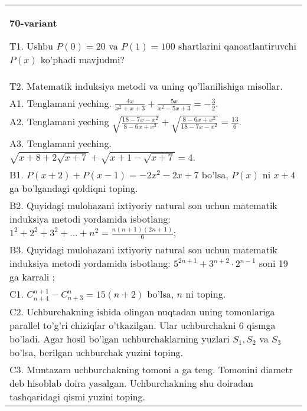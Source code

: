 \documentclass{article}
\begin{document}
\begin{tabular}{m{17cm}}
\textbf{70-variant}
\newline

T1. Ushbu \(P(0) = 20\) va \(P(1) = 100\) shartlarini qanoatlantiruvchi \(P(x)\) ko'phadi mavjudmi? \\
T2. Matematik induksiya metodi va uning qo'llanilishiga misollar. \\
A1. Tenglamani yeching. \(\frac{4x}{x^{2} + x + 3} + \frac{5x}{x^{2} - 5x + 3} = - \frac{3}{2}\). \\
A2. Tenglamani yeching \(\sqrt{\frac{18 - 7x - x^{2}}{8 - 6x + x^{2}}} + \sqrt{\frac{8 - 6x + x^{2}}{18 - 7x - x^{2}}} = \frac{13}{6}\). \\
A3. Tenglamani yeching. \(\sqrt{x + 8 + 2\sqrt{x + 7}} + \sqrt{x + 1 - \sqrt{x + 7}} = 4\). \\
B1. \(P(x + 2) + P(x - 1) = - 2x^{2} - 2x + 7\) bo'lsa, \(P(x)\) ni \(x + 4\) ga bo'lgandagi qoldiqni toping. \\
B2. Quyidagi mulohazani ixtiyoriy natural son uchun matematik induksiya metodi yordamida isbotlang: \(1^{2} + 2^{2} + 3^{2} + ... + n^{2} = \frac{n(n + 1)(2n + 1)}{6}\); \\
B3. Quyidagi mulohazani ixtiyoriy natural son uchun matematik induksiya metodi yordamida isbotlang: \(5^{2n + 1} + 3^{n + 2} \cdot 2^{n - 1}\) soni 19 ga karrali ; \\
C1. \(C_{n + 4}^{n + 1} - C_{n + 3}^{n} = 15(n + 2)\) bo'lsa, \(n\) ni toping. \\
C2. Uchburchakning ishida olingan nuqtadan uning tomonlariga parallel to'g'ri chiziqlar o'tkazilgan. Ular uchburchakni 6 qismga bo'ladi. Agar hosil bo'lgan uchburchaklarning yuzlari \(S_{1},S_{2}\) va \(S_{3}\) bo'lsa, berilgan uchburchak yuzini toping. \\
C3. Muntazam uchburchakning tomoni a ga teng. Tomonini diametr deb hisoblab doira yasalgan. Uchburchakning shu doiradan tashqaridagi qismi yuzini toping. \\

\end{tabular}
\vspace{1cm}
\end{document}
